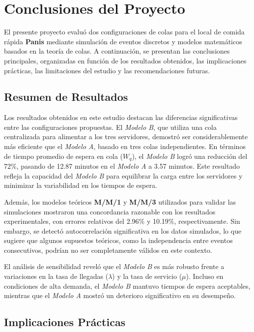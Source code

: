 \documentclass[a4paper,12pt]{article}
\begin{document}
\section{Conclusiones del Proyecto}

El presente proyecto evaluó dos configuraciones de colas para el local de comida rápida \textbf{Panis} mediante simulación de eventos discretos y modelos matemáticos basados en la teoría de colas. A continuación, se presentan las conclusiones principales, organizadas en función de los resultados obtenidos, las implicaciones prácticas, las limitaciones del estudio y las recomendaciones futuras.

\subsection{Resumen de Resultados}

Los resultados obtenidos en este estudio destacan las diferencias significativas entre las configuraciones propuestas. El \textit{Modelo B}, que utiliza una cola centralizada para alimentar a los tres servidores, demostró ser considerablemente más eficiente que el \textit{Modelo A}, basado en tres colas independientes. En términos de tiempo promedio de espera en cola (\( W_q \)), el \textit{Modelo B} logró una reducción del 72\%, pasando de 12.87 minutos en el \textit{Modelo A} a 3.57 minutos. Este resultado refleja la capacidad del \textit{Modelo B} para equilibrar la carga entre los servidores y minimizar la variabilidad en los tiempos de espera.

Además, los modelos teóricos \textbf{M/M/1} y \textbf{M/M/3} utilizados para validar las simulaciones mostraron una concordancia razonable con los resultados experimentales, con errores relativos del 2.96\% y 10.19\%, respectivamente. Sin embargo, se detectó autocorrelación significativa en los datos simulados, lo que sugiere que algunos supuestos teóricos, como la independencia entre eventos consecutivos, podrían no ser completamente válidos en este contexto.

El análisis de sensibilidad reveló que el \textit{Modelo B} es más robusto frente a variaciones en la tasa de llegadas (\( \lambda \)) y la tasa de servicio (\( \mu \)). Incluso en condiciones de alta demanda, el \textit{Modelo B} mantuvo tiempos de espera aceptables, mientras que el \textit{Modelo A} mostró un deterioro significativo en su desempeño.

\subsection{Implicaciones Prácticas}
\end{document}
